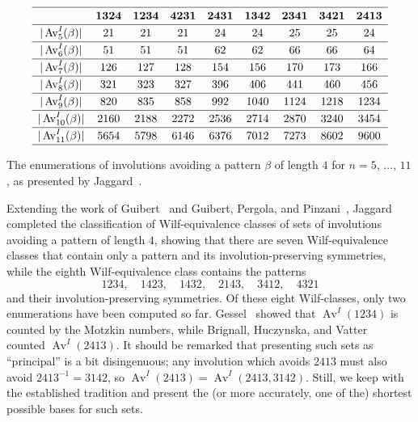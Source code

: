 \documentclass[10pt]{article}
\theoremstyle{plain}
\newcommand{\Av}{\operatorname{Av}}
\begin{document}
\begin{table}
$$
\begin{array}{ccccccccc}%
\hline
&&&&&&&&\\[-10pt]
&\bm{1324}&\bm{1234}&\bm{4231}&\bm{2431}&\bm{1342}&\bm{2341}&\bm{3421}&\bm{2413}\\[1pt]\hline
&&&&&&&&\\[-11pt]
|\Av^I_{5}(\beta)|&21&21&21&24&24&25&25&24\\[1pt]\hline
&&&&&&&&\\[-11pt]
|\Av^I_{6}(\beta)|&51&51&51&62&62&66&66&64\\[1pt]\hline
&&&&&&&&\\[-11pt]
|\Av^I_{7}(\beta)|&126&127&128&154&156&170&173&166\\[1pt]\hline
&&&&&&&&\\[-11pt]
|\Av^I_{8}(\beta)|&321&323&327&396&406&441&460&456\\[1pt]\hline
&&&&&&&&\\[-11pt]
|\Av^I_{9}(\beta)|&820&835&858&992&1040&1124&1218&1234\\[1pt]\hline
&&&&&&&&\\[-11pt]
|\Av^I_{10}(\beta)|&2160&2188&2272&2536&2714&2870&3240&3454\\[1pt]\hline
&&&&&&&&\\[-11pt]
|\Av^I_{11}(\beta)|&5654&5798&6146&6376&7012&7273&8602&9600\\[1pt]\hline
\end{array}
$$
\caption{The enumerations of involutions avoiding a pattern $\beta$ of length $4$ for $n=5$, $\dots$, $11$, as presented by Jaggard~\cite{jaggard:prefix-exchangi:}.}
\label{table-enum-1}
\end{table}

Extending the work of Guibert~\cite{guibert:combinatoire-de:} and Guibert, Pergola, and Pinzani~\cite{guibert:vexillary-invol:}, Jaggard~\cite{jaggard:prefix-exchangi:} completed the classification of Wilf-equivalence classes of sets of involutions avoiding a pattern of length $4$, showing that there are seven Wilf-equivalence classes that contain only a pattern and its involution-preserving symmetries, while the eighth Wilf-equivalence class contains the patterns
	\[1234,\quad1423,\quad1432,\quad2143,\quad3412,\quad4321\]
and their involution-preserving symmetries. Of these eight Wilf-classes, only two enumerations have been computed so far. Gessel~\cite{gessel:symmetric-funct:} showed that $\Av^I(1234)$ is counted by the Motzkin numbers, while Brignall, Huczynska, and Vatter~\cite{brignall:simple-permutat:} counted $\Av^I(2413)$. It should be remarked that presenting such sets as ``principal'' is a bit disingenuous; any involution which avoids $2413$ must also avoid $2413^{-1}=3142$, so $\Av^I(2413)=\Av^I(2413,3142)$. Still, we keep with the established tradition and present the (or more accurately, one of the) shortest possible bases for such sets.
\end{document}
